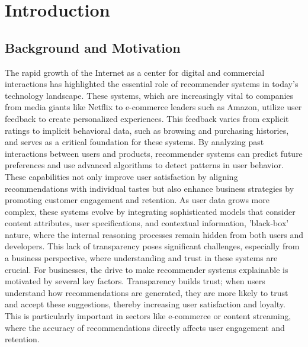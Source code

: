 \chapter{Introduction}\label{chap:introduction}

\section{Background and Motivation}
The rapid growth of the Internet as a center for digital and commercial
interactions has highlighted the essential role of recommender systems in today's
technology landscape. These systems, which are increasingly vital to companies
from media giants like Netflix to e-commerce leaders such as Amazon, utilize user
feedback to create personalized experiences. This feedback varies from explicit
ratings to implicit behavioral data, such as browsing and purchasing histories,
and serves as a critical foundation for these systems. By analyzing past interactions
between users and products, recommender systems can predict future preferences
and use advanced algorithms to detect patterns in user behavior. These capabilities
not only improve user satisfaction by aligning recommendations with individual tastes
but also enhance business strategies by promoting customer engagement and retention.
As user data grows more complex, these systems evolve by integrating sophisticated
models that consider content attributes, user specifications, and contextual information,
'black-box' nature, where the internal reasoning processes remain hidden from
both users and developers. This lack of transparency poses significant challenges,
especially from a business perspective, where understanding and trust in these systems
are crucial. For businesses, the drive to make recommender systems explainable is
motivated by several key factors. Transparency builds trust; when users understand
how recommendations are generated, they are more likely to trust and accept
these suggestions, thereby increasing user satisfaction and loyalty. This is
particularly important in sectors like e-commerce or content streaming, where the
accuracy of recommendations directly affects user engagement and retention.

